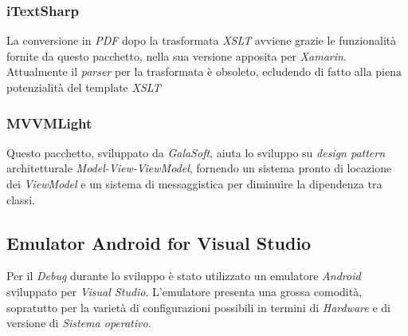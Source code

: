 \subsubsection{iTextSharp}
La conversione in \textit{PDF} dopo la trasformata \textit{XSLT} avviene grazie le funzionalità fornite da questo pacchetto, nella sua versione apposita per \textit{Xamarin}. Attualmente il \textit{parser} per la trasformata è obsoleto, ecludendo di fatto alla piena potenzialità del template \textit{XSLT}

\subsubsection{MVVMLight}
Questo pacchetto, sviluppato da \textit{GalaSoft}, aiuta lo sviluppo su \textit{design pattern} architetturale \textit{Model-View-ViewModel}, fornendo un sistema pronto di locazione dei \textit{ViewModel} e un sistema di messaggistica per diminuire la dipendenza tra classi.

\subsection{Emulator Android for Visual Studio}
Per il \textit{Debug} durante lo sviluppo è stato utilizzato un emulatore \textit{Android} sviluppato per \textit{Visual Studio}. L'emulatore presenta una grossa comodità, sopratutto per la varietà di configurazioni possibili in termini di \textit{Hardware} e di versione di \textit{Sistema operativo}.


